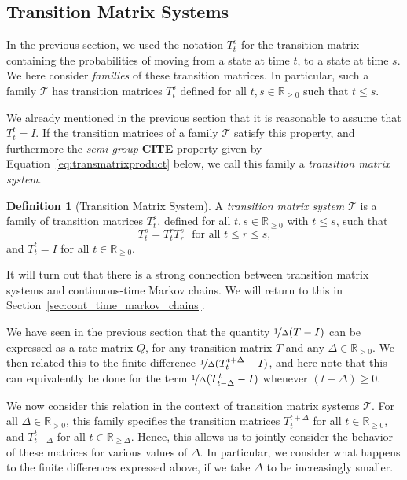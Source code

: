\documentclass[10pt,a4paper]{paper}
\theoremstyle{definition}
\newtheorem{definition}{Definition}
\newcommand{\reals}{\mathbb{R}}
\newcommand{\realspos}{\reals_{>0}}
\newcommand{\realsnonneg}{\reals_{\geq 0}}
\begin{document}
\subsection{Transition Matrix Systems}

In the previous section, we used the notation $T_t^s$ for the transition matrix containing the probabilities of moving from a state at time $t$, to a state at time $s$. We here consider \emph{families} of these transition matrices. In particular, such a family $\mathcal{T}$ has transition matrices $T_t^s$ defined for all $t,s\in\realsnonneg$ such that $t\leq s$. 

We already mentioned in the previous section that it is reasonable to assume that $T_t^t=I$. If the transition matrices of a family $\mathcal{T}$ satisfy this property, and furthermore the \emph{semi-group} {\bf CITE} property given by Equation~\ref{eq:transmatrixproduct} below, we call this family a \emph{transition matrix system}.

\begin{definition}[Transition Matrix System]\label{def:trans_mat_system}
A \emph{transition matrix system} $\mathcal{T}$ is a family of transition matrices $T_t^s$, defined for all $t,s\in\realsnonneg$ with $t\leq s$, such that
\begin{equation}\label{eq:transmatrixproduct}
T_t^s=T_t^r T_r^s
\text{~~for all $t\leq r\leq s$,}
\end{equation}
and $T_t^t=I$ for all $t\in\realsnonneg$.
\end{definition}
It will turn out that there is a strong connection between transition matrix systems and continuous-time Markov chains. We will return to this in Section~\ref{sec:cont_time_markov_chains}.

We have seen in the previous section that the quantity $\nicefrac{1}{\Delta}(T - I)$ can be expressed as a rate matrix $Q$, for any transition matrix $T$ and any $\Delta\in\realspos$. We then related this to the finite difference $\nicefrac{1}{\Delta}(T_t^{t+\Delta} - I)$, and here note that this can equivalently be done for the term $\nicefrac{1}{\Delta}(T_{t-\Delta}^t - I)$ whenever $(t-\Delta)\geq0$.

We now consider this relation in the context of transition matrix systems $\mathcal{T}$. For all $\Delta\in\realspos$, this family specifies the transition matrices $T_t^{t+\Delta}$  for all $t\in\realsnonneg$, and $T_{t-\Delta}^t$ for all  $t\in\reals_{\geq\Delta}$. Hence, this allows us to jointly consider the behavior of these matrices for various values of $\Delta$. In particular, we consider what happens to the finite differences expressed above, if we take $\Delta$ to be increasingly smaller. 
\end{document}
